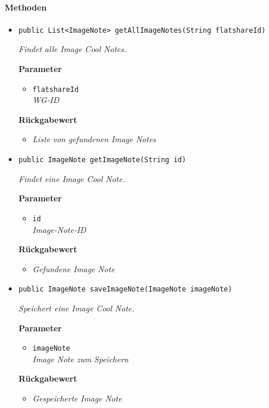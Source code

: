      \paragraph*{Methoden}
     \begin{itemize}
     	\item{\texttt{public List<ImageNote> getAllImageNotes(String flatshareId)}}
     	
     	\textit{Findet alle Image Cool Notes.}
     	
     	\textbf{Parameter}
     	\begin{itemize}
     		\item\texttt{flatshareId}\\
     		\textit{WG-ID}
     	\end{itemize}
     	
     	\textbf{Rückgabewert}
     	\begin{itemize}
     		\item\textit{Liste von gefundenen Image Notes}
     	\end{itemize}
     
     \item{\texttt{public ImageNote getImageNote(String id)}}
     	
     	\textit{Findet eine Image Cool Note.}
     	
     	\textbf{Parameter}
     	\begin{itemize}
     		\item\texttt{id}\\
     		\textit{Image-Note-ID}
     	\end{itemize}
     	
     	\textbf{Rückgabewert}
     	\begin{itemize}
     		\item\textit{Gefundene Image Note}
     	\end{itemize}
     
     \item{\texttt{public ImageNote saveImageNote(ImageNote imageNote)}}
     	
     	\textit{Speichert eine Image Cool Note.}
     	
     	\textbf{Parameter}
     	\begin{itemize}
     		\item\texttt{imageNote}\\
   			\textit{Image Note zum Speichern}
   		\end{itemize}
   	
     	\textbf{Rückgabewert}
     	\begin{itemize}
     		\item\textit{Gespeicherte Image Note}
     	\end{itemize}
     

\end{itemize}
